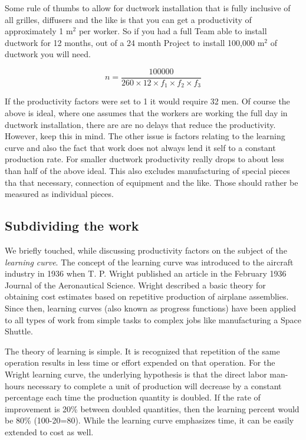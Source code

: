 Some rule of thumbs to allow for ductwork installation that is fully inclusive
of all grilles, diffusers and the like is that you can get a productivity of
approximately 1 m$^2$ per worker. So if you had a full Team able to install 
ductwork for 12 months, out of a 24 month Project to install 100,000 m$^2$ of
ductwork you will need.

\[ n = \frac{100000}{260 \times 12 \times f_1 \times f_2 \times f_3}   \]


If the productivity factors were set to 1 it would require 32 men. Of course the
above is ideal, where one assumes that the workers are working the full day
in ductwork installation, there are are no delays that reduce the productivity.
However, keep this in mind. The other issue is factors relating to the learning
curve and also the fact that work does not always lend it self to a constant
production rate. For smaller ductwork productivity really drops to about less
than half of the above ideal. This also excludes manufacturing of special pieces
tha that necessary, connection of equipment and the like. Those should rather
be measured as individual pieces.

\subsection*{Subdividing the work}

We briefly touched, while discussing productivity factors on the subject
of the \textit{learning curve}. The concept of the learning curve was introduced to the aircraft industry in 1936 when T. P. Wright published an article in the February 1936 Journal of the Aeronautical Science. Wright described a basic theory for obtaining cost estimates based on repetitive production of airplane assemblies. Since then, learning curves (also known as progress functions) have been applied to all types of work from simple tasks to complex jobs like manufacturing a Space Shuttle.

The theory of learning is simple. It is recognized that repetition of the same operation results in less time or effort expended on that operation. For the Wright learning curve, the underlying hypothesis is that the direct labor man-hours necessary to complete a unit of production will decrease by a constant percentage each time the production quantity is doubled. If the rate of improvement is 20\% between doubled quantities, then the learning percent would be 80\% (100-20=80). While the learning curve emphasizes time, it can be easily extended to cost as well.

